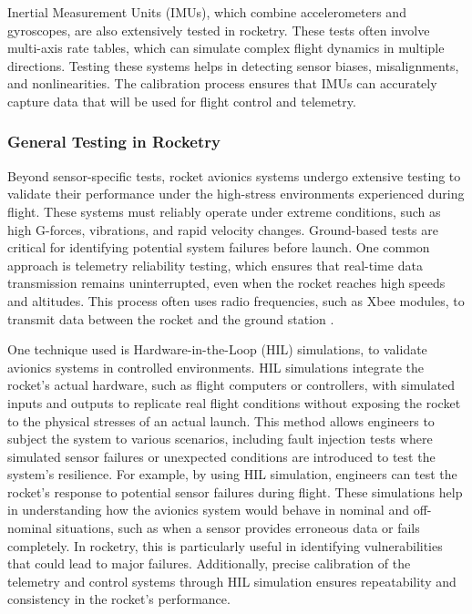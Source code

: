 Inertial Measurement Units (IMUs), which combine accelerometers and gyroscopes, are also extensively tested in rocketry. These tests often involve multi-axis rate tables, which can simulate complex flight dynamics in multiple directions. Testing these systems helps in detecting sensor biases, misalignments, and nonlinearities.  The calibration process ensures that IMUs can accurately capture data that will be used for flight control and telemetry​.  

\subsubsection{General Testing in Rocketry}
Beyond sensor-specific tests, rocket avionics systems undergo extensive testing to validate their performance under the high-stress environments experienced during flight. These systems must reliably operate under extreme conditions, such as high G-forces, vibrations, and rapid velocity changes. Ground-based tests are critical for identifying potential system failures before launch. One common approach is telemetry reliability testing, which ensures that real-time data transmission remains uninterrupted, even when the rocket reaches high speeds and altitudes. This process often uses radio frequencies, such as Xbee modules, to transmit data between the rocket and the ground station \cite{rocket_telemetry}.

One technique used is Hardware-in-the-Loop (HIL) simulations, to validate avionics systems in controlled environments. HIL simulations integrate the rocket's actual hardware, such as flight computers or controllers, with simulated inputs and outputs to replicate real flight conditions without exposing the rocket to the physical stresses of an actual launch. This method allows engineers to subject the system to various scenarios, including fault injection tests where simulated sensor failures or unexpected conditions are introduced to test the system’s resilience. For example, by using HIL simulation, engineers can test the rocket's response to potential sensor failures during flight. These simulations help in understanding how the avionics system would behave in nominal and off-nominal situations, such as when a sensor provides erroneous data or fails completely. In rocketry, this is particularly useful in identifying vulnerabilities that could lead to major failures. Additionally, precise calibration of the telemetry and control systems through HIL simulation ensures repeatability and consistency in the rocket's performance.

